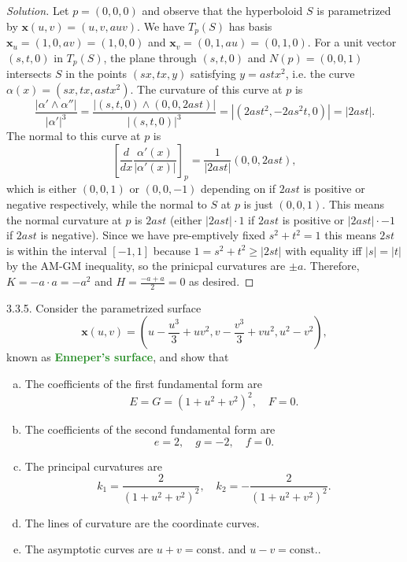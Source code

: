 \documentclass[10pt]{scrartcl}
\providecommand{\ii}{\item}
\providecommand{\mb}[1]{\mathbf{#1}}
\newenvironment{soln}{\begin{proof}[Solution]}{\end{proof}}
\providecommand{\vocab}[1]{{\textbf{\textcolor{ForestGreen}{#1}}}}
\begin{document}
\begin{soln}
	Let $p = (0,0,0)$ and observe that
	the hyperboloid $S$ is parametrized by $\mb x(u,v) = (u,v,auv)$.
	We have $T_p(S)$ has basis $\mb x_u = (1,0,av) = (1,0,0)$
	and $\mb x_v = (0,1,au) = (0,1,0)$.
	For a unit vector $(s,t,0)$ in $T_p(S)$,
	the plane through $(s,t,0)$ and $N(p) = (0,0,1)$ intersects $S$
	in the points $(sx, tx, y)$ satisfying $y = astx^2$,
	i.e. the curve $\alpha(x) = (sx,tx,astx^2)$. The curvature of this curve
	at $p$ is
	\[\frac{|\alpha'\wedge\alpha''|}{|\alpha'|^3}
	= \frac{|(s,t,0)\wedge(0,0,2ast)|}{|(s,t,0)|^3}
	= |(2ast^2,-2as^2t,0)| = |2ast|.\]
	The normal to this curve at $p$ is
	\[\left[\frac{d}{dx}\frac{\alpha'(x)}{|\alpha'(x)|}\right]_p
	= \frac{1}{|2ast|}
	(0,0,2ast),\]
	which is either $(0,0,1)$ or $(0,0,-1)$
	depending on if $2ast$ is positive or negative respectively,
	while the normal to $S$ at $p$ is just $(0,0,1)$.
	This means the normal curvature at $p$ is $2ast$
	(either $|2ast|\cdot 1$ if $2ast$ is positive
	or $|2ast|\cdot -1$ if $2ast$ is negative).
	Since we have pre-emptively fixed $s^2+t^2=1$ this means
	$2st$ is within the interval $[-1,1]$ because $1 = s^2+t^2 \ge |2st|$
	with equality iff $|s| = |t|$ by the AM-GM inequality,
	so the prinicpal curvatures are $\pm a$.
	Therefore, $K = -a\cdot a = \boxed{-a^2}$ and
	$H = \frac{-a + a}{2} = \boxed 0$ as desired.
\end{soln}

\pagebreak
\begin{problem*}3.3.5.
	Consider the parametrized surface
	\[\mb x(u,v) = \left(u-\frac{u^3}{3}+uv^2,
	v-\frac{v^3}{3}+vu^2,u^2-v^2\right),\]
	known as \vocab{Enneper's surface}, and show that
	\begin{enumerate}[(a)]
		\ii The coefficients of the first fundamental form are
		\[E = G = (1+u^2+v^2)^2,\quad F=0.\]
		\ii The coefficients of the second fundamental form are
		\[e=2,\quad g=-2,\quad f=0.\]
		\ii The principal curvatures are
		\[k_1 = \frac{2}{(1+u^2+v^2)^2},\quad
		k_2 = -\frac{2}{(1+u^2+v^2)^2}.\]
		\ii The lines of curvature are the coordinate curves.
		\ii The asymptotic curves are
		$u+v=\mathrm{const.}$ and $u-v=\mathrm{const.}$.
	\end{enumerate}
\end{problem*}
\end{document}
